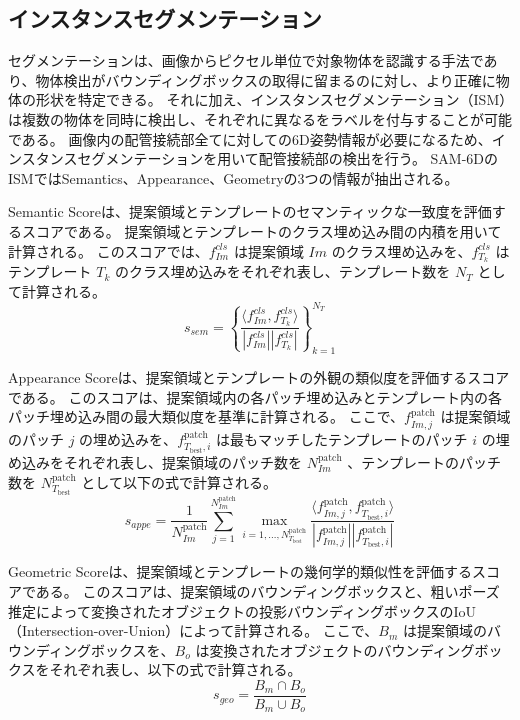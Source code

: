 
\subsection{インスタンスセグメンテーション}
セグメンテーションは、画像からピクセル単位で対象物体を認識する手法であり、物体検出がバウンディングボックスの取得に留まるのに対し、より正確に物体の形状を特定できる。
それに加え、インスタンスセグメンテーション（ISM）は複数の物体を同時に検出し、それぞれに異なるをラベルを付与することが可能である。
画像内の配管接続部全てに対しての6D姿勢情報が必要になるため、インスタンスセグメンテーションを用いて配管接続部の検出を行う。
SAM-6DのISMではSemantics、Appearance、Geometryの3つの情報が抽出される。

Semantic Scoreは、提案領域とテンプレートのセマンティックな一致度を評価するスコアである。
提案領域とテンプレートのクラス埋め込み間の内積を用いて計算される。
このスコアでは、$f^{cls}_{Im}$ は提案領域 $Im$ のクラス埋め込みを、$f^{cls}_{T_k}$ はテンプレート $T_k$ のクラス埋め込みをそれぞれ表し、テンプレート数を $N_T$ として計算される。
\[
s_{sem} = \left\{ \frac{\langle f^{cls}_{Im}, f^{cls}_{T_k} \rangle}{|f^{cls}_{Im}||f^{cls}_{T_k}|} \right\}_{k=1}^{N_T}
\]

Appearance Scoreは、提案領域とテンプレートの外観の類似度を評価するスコアである。
このスコアは、提案領域内の各パッチ埋め込みとテンプレート内の各パッチ埋め込み間の最大類似度を基準に計算される。
ここで、$f^{\text{patch}}_{Im,j}$ は提案領域のパッチ $j$ の埋め込みを、$f^{\text{patch}}_{T_{\text{best}},i}$ は最もマッチしたテンプレートのパッチ $i$ の埋め込みをそれぞれ表し、提案領域のパッチ数を $N_{Im}^{\text{patch}}$ 、テンプレートのパッチ数を $N_{T_{\text{best}}}^{\text{patch}}$ として以下の式で計算される。
\[
s_{appe} = \frac{1}{N_{Im}^{\text{patch}}} \sum_{j=1}^{N_{Im}^{\text{patch}}} \max_{i=1, \dots, N_{T_{\text{best}}}^{\text{patch}}} \frac{\langle f^{\text{patch}}_{Im,j}, f^{\text{patch}}_{T_{\text{best}},i} \rangle}{|f^{\text{patch}}_{Im,j}| |f^{\text{patch}}_{T_{\text{best}},i}|}
\]

Geometric Scoreは、提案領域とテンプレートの幾何学的類似性を評価するスコアである。
このスコアは、提案領域のバウンディングボックスと、粗いポーズ推定によって変換されたオブジェクトの投影バウンディングボックスのIoU（Intersection-over-Union）によって計算される。
ここで、$B_m$ は提案領域のバウンディングボックスを、$B_o$ は変換されたオブジェクトのバウンディングボックスをそれぞれ表し、以下の式で計算される。
\[
s_{geo} = \frac{B_m \cap B_o}{B_m \cup B_o}
\]

